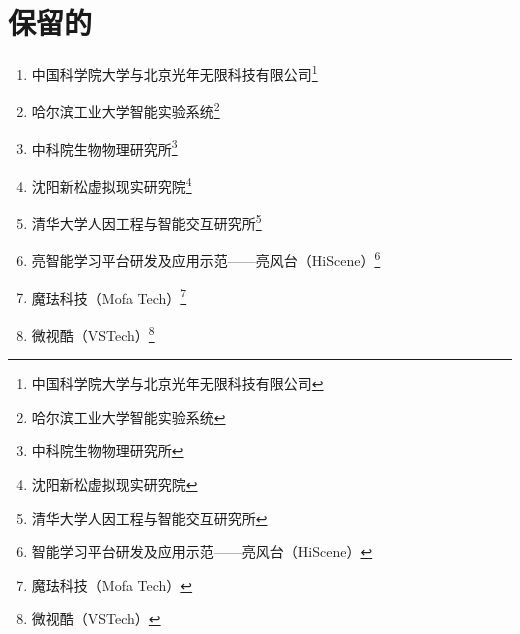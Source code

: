 \section{保留的}

\begin{enumerate}
    \item 中国科学院大学与北京光年无限科技有限公司\footnote{中国科学院大学与北京光年无限科技有限公司}
    \item 哈尔滨工业大学智能实验系统\footnote{哈尔滨工业大学智能实验系统}
    \item 中科院生物物理研究所\footnote{中科院生物物理研究所}
    \item 沈阳新松虚拟现实研究院\footnote{沈阳新松虚拟现实研究院}
    \item 清华大学人因工程与智能交互研究所\footnote{清华大学人因工程与智能交互研究所}
    \item 亮智能学习平台研发及应用示范——亮风台（HiScene）\footnote{智能学习平台研发及应用示范——亮风台（HiScene）}
    \item 魔珐科技（Mofa Tech）\footnote{魔珐科技（Mofa Tech）}
    \item 微视酷（VSTech）\footnote{微视酷（VSTech）}
\end{enumerate}
